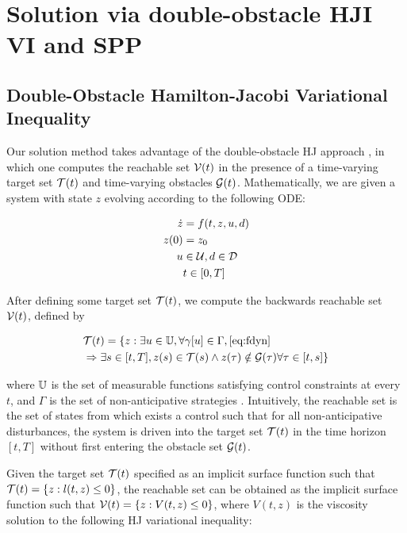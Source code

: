 \section{Solution via double-obstacle HJI VI and SPP\label{sec:solution}}
\subsection{Double-Obstacle Hamilton-Jacobi Variational Inequality}
Our solution method takes advantage of the double-obstacle HJ approach \cite{Fisac15}, in which one computes the reachable set $\mathcal{V}(t)$ in the presence of a time-varying target set $\mathcal{T}(t)$ and time-varying obstacles $\mathcal{G}(t)$. Mathematically, we are given a system with state $z$ evolving according to the following ODE:

\begin{equation}
\label{eq:fdyn} %
\begin{aligned}
\dot{z} &= f(t, z, u, d) \\
z(0) &= z_0 \\
u &\in \cset, d \in \dset \\
&t \in [0, T]
\end{aligned}
\end{equation}

After defining some target set $\mathcal{T}(t)$, we compute the backwards reachable set $\mathcal{V}(t)$, defined by

\begin{equation}
\begin{aligned}
&\mathcal{T}(t) = \{z: \exists u \in \mathbb{U}, \forall \gamma[u] \in \Gamma, \eqref{eq:fdyn} \\
&\Rightarrow \exists s \in [t, T], z(s) \in \mathcal{T}(s) \wedge z(\tau) \notin \mathcal{G}(\tau) \forall \tau \in [t, s]\}
\end{aligned}
\end{equation}

\noindent where $\mathbb{U}$ is the set of measurable functions satisfying control constraints at every $t$, and $\Gamma$ is the set of non-anticipative strategies \cite{Mitchell05}. Intuitively, the reachable set is the set of states from which exists a control such that for all non-anticipative disturbances, the system is driven into the target set $\mathcal{T}(t)$ in the time horizon $[t, T]$ without first entering the obstacle set $\mathcal{G}(t)$.

Given the target set $\mathcal{T}(t)$ specified as an implicit surface function such that $\mathcal{T}(t) = \{z: l(t, z) \le 0\}$, the reachable set can be obtained as the implicit surface function such that $\mathcal{V}(t) = \{z: V(t, z) \le 0\}$, where $V(t, z)$ is the viscosity solution \cite{Crandall83} to the following HJ variational inequality:

